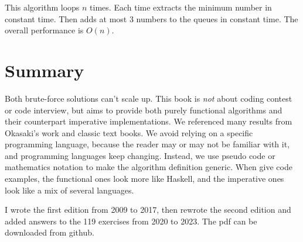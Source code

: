 \documentclass[b5paper]{article}
\begin{document}
This algorithm loops $n$ times. Each time extracts the minimum number in constant time. Then adds at most 3 numbers to the queues in constant time. The overall performance is $O(n)$.

\section*{Summary}
Both brute-force solutions can't scale up. This book is {\em not} about coding contest or code interview, but aims to provide both purely functional algorithms and their counterpart imperative implementations. We referenced many results from Okasaki's work\cite{okasaki-book} and classic text books\cite{CLRS}. We avoid relying on a specific programming language, because the reader may or may not be familiar with it, and programming languages keep changing. Instead, we use pseudo code or mathematics notation to make the algorithm definition generic. When give code examples, the functional ones look more like Haskell, and the imperative ones look like a mix of several languages.

I wrote the first edition from 2009 to 2017, then rewrote the second edition and added answers to the 119 exercises from 2020 to 2023. The pdf can be downloaded from github.

\begin{Exercise}\label{ex:preface}


\end{Exercise}
\end{document}

